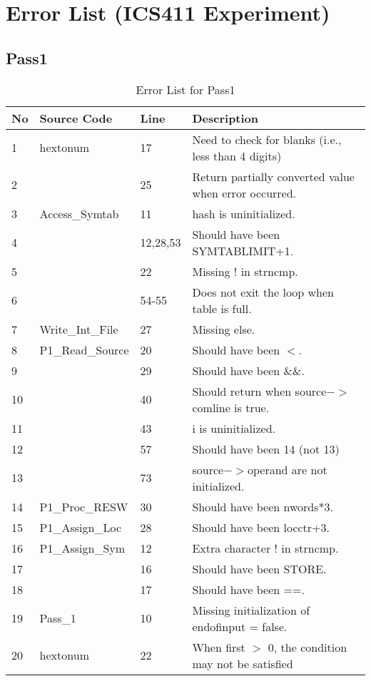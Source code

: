 \chapter {Error List (ICS411 Experiment)}

\section {Pass1}

\begin{table}[hb]
\begin{center}
\begin{tabular}{|l|l|l|l|}
\hline
No & Source Code & Line & Description \\
\hline
1 & hextonum & 17 & Need to check for blanks (i.e., less than 4 digits)\\
2 &          & 25 & Return partially converted value when error occurred. \\ 
3 & Access\_Symtab & 11 & hash is uninitialized. \\ 
4 &               & 12,28,53 & Should have been SYMTABLIMIT+1.\\
5 &               & 22& Missing ! in strncmp.\\
6 &               & 54-55 & Does not exit the loop when table is full.\\
7 & Write\_Int\_File  & 27 & Missing else. \\ 
8 & P1\_Read\_Source  & 20 & Should have been $<$. \\
9 &               & 29 & Should have been \&\&. \\
10 &              & 40 & Should return when source$->$comline is true.\\
11 &              & 43 & i is uninitialized. \\ 
12 &              & 57 & Should have been 14 (not 13) \\
13 &              & 73 & source$->$operand are not initialized.\\
14 & P1\_Proc\_RESW & 30 & Should have been nwords*3.\\ 
15 & P1\_Assign\_Loc & 28 & Should have been locctr+3.\\
16 & P1\_Assign\_Sym & 12 & Extra character ! in strncmp.\\
17 &                 & 16 & Should have been STORE.\\ 
18 &                 & 17 & Should have been ==.\\ 
19 & Pass\_1 & 10  & Missing initialization of endofinput = false.\\
20 & hextonum & 22 & When first $>$ 0, the condition may not be satisfied\\
\hline
\end{tabular}
\caption{Error List for Pass1}
\end{center}
\end{table}

